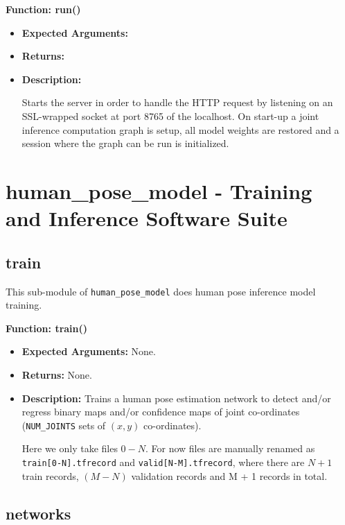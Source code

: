 \documentclass{scrreprt}
\begin{document}
\textbf{Function: run()}
\begin{itemize}
    \item \textbf{Expected Arguments:}

    \item \textbf{Returns:}

    \item \textbf{Description:}

            Starts the server in order to handle the HTTP request by listening
                on an SSL-wrapped socket at port 8765 of the localhost. On
                start-up a joint inference computation graph is setup, all
                model weights are restored and a session where the graph can be
                run is initialized.

\end{itemize}

\section{human\_pose\_model - Training and Inference Software Suite}

\subsection{train}

This sub-module of \verb|human_pose_model| does human pose inference model
training.

\textbf{Function: train()}

\begin{itemize}
        \item \textbf{Expected Arguments:} None.

        \item \textbf{Returns:} None.

        \item \textbf{Description:} Trains a human pose estimation network to
                detect and/or regress binary maps and/or confidence maps of
                joint co-ordinates (\verb|NUM_JOINTS| sets of $(x, y)$ co-ordinates).

                Here we only take files $0-N$.  For now files are manually renamed as
                \verb|train[0-N].tfrecord| and \verb|valid[N-M].tfrecord|,
                where there are $N + 1$ train records, $(M - N)$ validation
                records and M + 1 records in total.
\end{itemize}

\subsection{networks}
\end{document}
